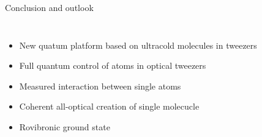 \documentclass{beamer}
\begin{document}
\begin{frame}[t]{Conclusion and outlook}
  \vspace{-0.5cm}
  \begin{columns}
    \column{6.25cm}
    \begin{itemize}
    \item New quatum platform based on ultracold molecules in tweezers
    \item<2-> Full quantum control of atoms in optical tweezers
    \item<3-> Measured interaction between single atoms
    \item<4-> Coherent all-optical creation of single molecucle
    \item<5-> Rovibronic ground state
    \end{itemize}
    \column{5.7cm}
  \end{columns}
\end{frame}
\fi
\end{document}
